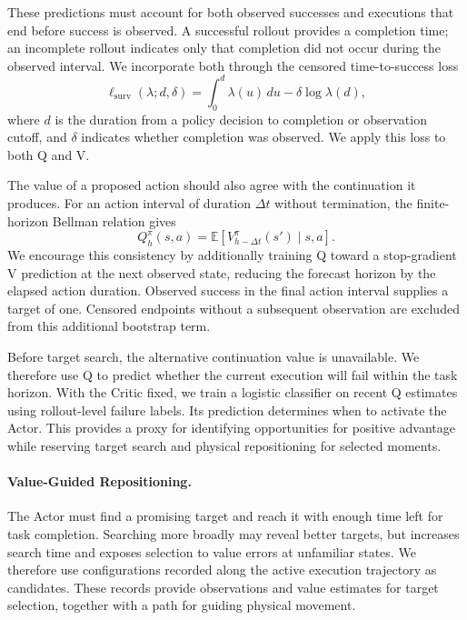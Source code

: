 These predictions must account for both observed successes and
executions that end before success is observed. A successful
rollout provides a completion time; an incomplete rollout indicates
only that completion did not occur during the observed interval.
We incorporate both through the censored time-to-success loss
\begin{equation}
\ell_{\mathrm{surv}}(\lambda;d,\delta)
=\int_0^d\lambda(u)\,du-\delta\log\lambda(d),
\label{eq:survival-loss}
\end{equation}
where $d$ is the duration from a policy decision to completion or
observation cutoff, and $\delta$ indicates whether completion
was observed. We apply this loss to both Q and V.

The value of a proposed action should also agree with the
continuation it produces. For an action interval of duration
$\Delta t$ without termination, the finite-horizon Bellman relation gives~\citep{sutton2018reinforcement}
\begin{equation}
Q_h^\pi(s,a)
=\mathbb E\!\left[V_{h-\Delta t}^\pi(s')\mid s,a\right].
\label{eq:qv-consistency}
\end{equation}
We encourage this consistency by additionally training Q toward
a stop-gradient V prediction at the next observed state, reducing
the forecast horizon by the elapsed action duration. Observed
success in the final action interval supplies a target of one.
Censored endpoints without a subsequent observation are excluded
from this additional bootstrap term.

Before target search, the alternative continuation value is
unavailable. We therefore use Q to predict whether the current
execution will fail within the task horizon. With the Critic
fixed, we train a logistic classifier on recent Q estimates
using rollout-level failure labels. Its prediction determines
when to activate the Actor. This provides a proxy for identifying
opportunities for positive advantage while reserving target
search and physical repositioning for selected moments.

\paragraph{Value-Guided Repositioning.}
The Actor must find a promising target and reach it with enough
time left for task completion. Searching more broadly may reveal
better targets, but increases search time and exposes selection
to value errors at unfamiliar states. We therefore use configurations
recorded along the active execution trajectory as candidates.
These records provide observations and value estimates for target
selection, together with a path for guiding physical movement.

